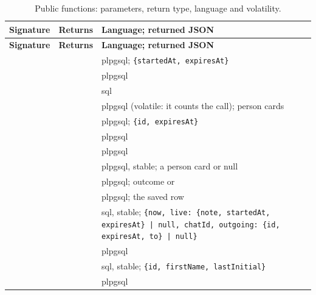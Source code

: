 \begingroup\tablefont
\begin{longtable}{@{}L{58mm}L{24mm}L{\dimexpr\linewidth-82mm-4\tabcolsep\relax}@{}}
  \caption{Public functions: parameters, return type, language and volatility.}
  \label{tab:function-signatures}\\
  \toprule
  \textsf{\textbf{Signature}} & \textsf{\textbf{Returns}} & \textsf{\textbf{Language; returned JSON}} \\
  \midrule
  \endfirsthead
  \toprule
  \textsf{\textbf{Signature}} & \textsf{\textbf{Returns}} & \textsf{\textbf{Language; returned JSON}} \\
  \midrule
  \endhead
  \bottomrule
  \endfoot
   &  & plpgsql; \texttt{\{startedAt, expiresAt\}} \\
   &  & plpgsql \\
   &  & sql \\
   &  & plpgsql (volatile: it counts the call); person cards \\
   &  & plpgsql; \texttt{\{id, expiresAt\}} \\
   &  & plpgsql \\
   &  & plpgsql \\
   &  & plpgsql, stable; a person card or null \\
   &  & plpgsql; outcome  or  \\
   &  & plpgsql; the saved  row \\
   &  & sql, stable; \texttt{\{now, live: \{note, startedAt, expiresAt\} | null, chatId, outgoing: \{id, expiresAt, to\} | null\}} \\
   &  & plpgsql \\
   &  & sql, stable; \texttt{\{id, firstName, lastInitial\}} \\
   &  & plpgsql \\

\end{longtable}
